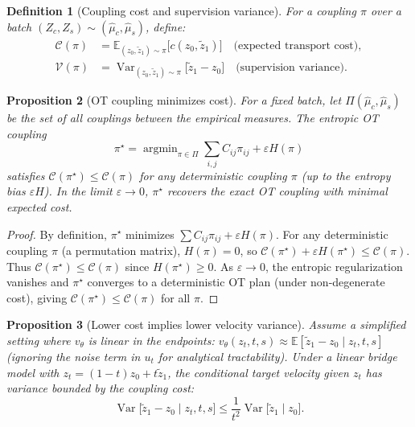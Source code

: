 \documentclass[letterpaper]{article}
\newtheorem{proposition}{Proposition}[section]
\newtheorem{definition}[proposition]{Definition}
\newcommand{\E}{\mathbb{E}}
\newcommand{\Var}{\operatorname{Var}}
\newcommand{\argmin}{\operatorname{argmin}}
\begin{document}
\begin{definition}[Coupling cost and supervision variance]
For a coupling $\pi$ over a batch $(Z_c, Z_s) \sim (\hat\mu_c, \hat\mu_s)$,
define:
\begin{align}
    \mathcal{C}(\pi) &= \E_{(z_0, \tilde z_1) \sim \pi} \bigl[ c(z_0, \tilde z_1) \bigr]
        \quad \text{(expected transport cost)}, \\
    \mathcal{V}(\pi) &= \Var_{(z_0, \tilde z_1) \sim \pi} \bigl[ \tilde z_1 - z_0 \bigr]
        \quad \text{(supervision variance)}.
\end{align}
\end{definition}

\begin{proposition}[OT coupling minimizes cost]
\label{prop:ot_min_cost}
For a fixed batch, let $\Pi(\hat\mu_c, \hat\mu_s)$ be the set of all
couplings between the empirical measures. The entropic OT coupling
\begin{equation}
    \pi^\star = \argmin_{\pi \in \Pi} \sum_{i,j} C_{ij} \pi_{ij} + \varepsilon H(\pi)
\end{equation}
satisfies $\mathcal{C}(\pi^\star) \leq \mathcal{C}(\pi)$ for any
deterministic coupling $\pi$ (up to the entropy bias $\varepsilon H$).
In the limit $\varepsilon \to 0$, $\pi^\star$ recovers the exact OT coupling
with minimal expected cost.
\end{proposition}

\begin{proof}
By definition, $\pi^\star$ minimizes $\sum C_{ij}\pi_{ij} + \varepsilon H(\pi)$.
For any deterministic coupling $\pi$ (a permutation matrix), $H(\pi)=0$, so
$\mathcal{C}(\pi^\star) + \varepsilon H(\pi^\star) \leq \mathcal{C}(\pi)$.
Thus $\mathcal{C}(\pi^\star) \leq \mathcal{C}(\pi)$ since $H(\pi^\star) \geq 0$.
As $\varepsilon \to 0$, the entropic regularization vanishes and $\pi^\star$
converges to a deterministic OT plan (under non-degenerate cost), giving
$\mathcal{C}(\pi^\star) \leq \mathcal{C}(\pi)$ for all $\pi$.
\end{proof}

\begin{proposition}[Lower cost implies lower velocity variance]
\label{prop:cost_to_variance}
Assume a simplified setting where $v_\theta$ is linear in the endpoints:
$v_\theta(z_t, t, s) \approx \E[\tilde z_1 - z_0 \mid z_t, t, s]$
(ignoring the noise term in $u_t$ for analytical tractability).
Under a linear bridge model with $z_t = (1-t)z_0 + t\tilde z_1$,
the conditional target velocity given $z_t$ has variance bounded by
the coupling cost:
\begin{equation}
    \Var\bigl[ \tilde z_1 - z_0 \mid z_t, t, s \bigr]
    \leq \frac{1}{t^2} \Var\bigl[ \tilde z_1 \mid z_0 \bigr].
\end{equation}
\end{proposition}
\end{document}
